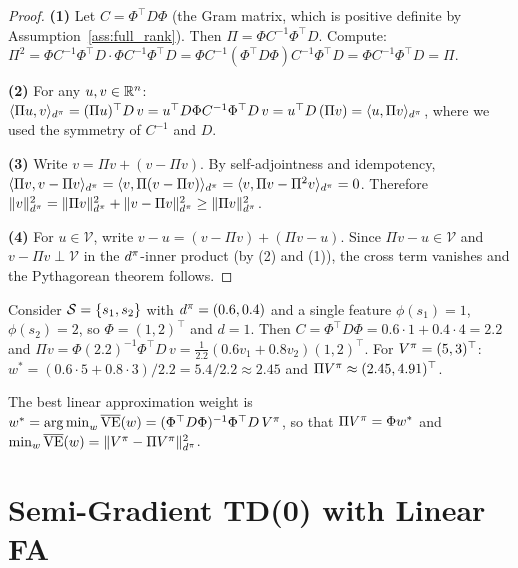 \documentclass[11pt,a4paper]{article}
\begin{document}
\begin{proof}
\textbf{(1)} Let $C = \Phi^\top D \Phi$ (the Gram matrix, which is
positive definite by Assumption~\ref{ass:full_rank}). Then
$\Pi = \Phi C^{-1} \Phi^\top D$. Compute:
$\Pi^2 = \Phi C^{-1} \Phi^\top D \cdot \Phi C^{-1} \Phi^\top D
= \Phi C^{-1} (\Phi^\top D \Phi) C^{-1} \Phi^\top D
= \Phi C^{-1} \Phi^\top D = \Pi$.

\textbf{(2)} For any $u, v \in \mathbb{R}^n$:
$\langle \Pi u, v \rangle_{d^\pi}
= (\Pi u)^\top D\, v
= u^\top D \Phi C^{-1} \Phi^\top D\, v
= u^\top D\, (\Pi v)
= \langle u, \Pi v \rangle_{d^\pi}$,
where we used the symmetry of $C^{-1}$ and $D$.

\textbf{(3)} Write $v = \Pi v + (v - \Pi v)$. By self-adjointness and
idempotency, $\langle \Pi v, v - \Pi v \rangle_{d^\pi}
= \langle v, \Pi(v - \Pi v) \rangle_{d^\pi}
= \langle v, \Pi v - \Pi^2 v \rangle_{d^\pi} = 0$.
Therefore $\|v\|_{d^\pi}^2 = \|\Pi v\|_{d^\pi}^2
+ \|v - \Pi v\|_{d^\pi}^2 \geq \|\Pi v\|_{d^\pi}^2$.

\textbf{(4)} For $u \in \mathcal{V}$, write
$v - u = (v - \Pi v) + (\Pi v - u)$. Since $\Pi v - u \in \mathcal{V}$
and $v - \Pi v \perp \mathcal{V}$ in the $d^\pi$-inner product
(by (2) and (1)), the cross term vanishes and the Pythagorean theorem
follows.
\end{proof}

\begin{example}
\label{ex:projection}
Consider $\mathcal{S} = \{s_1, s_2\}$ with $d^\pi = (0.6, 0.4)$ and
a single feature $\phi(s_1) = 1$, $\phi(s_2) = 2$, so
$\Phi = (1, 2)^\top$ and $d = 1$. Then
$C = \Phi^\top D \Phi = 0.6 \cdot 1 + 0.4 \cdot 4 = 2.2$ and
$\Pi v = \Phi (2.2)^{-1} \Phi^\top D\, v
= \frac{1}{2.2}(0.6 v_1 + 0.8 v_2)(1, 2)^\top$.
For $V^\pi = (5, 3)^\top$:
$w^* = (0.6 \cdot 5 + 0.8 \cdot 3)/2.2 = 5.4/2.2 \approx 2.45$
and $\Pi V^\pi \approx (2.45, 4.91)^\top$.
\end{example}

The best linear approximation weight is
$w^* = \operatorname{arg\,min}_w \overline{\mathrm{VE}}(w)
= (\Phi^\top D \Phi)^{-1} \Phi^\top D\, V^\pi$, so that
$\Pi V^\pi = \Phi w^*$ and
$\min_w \overline{\mathrm{VE}}(w)
= \|V^\pi - \Pi V^\pi\|_{d^\pi}^2$.

\section{Semi-Gradient TD(0) with Linear FA}
\label{sec:semi_gradient}
\end{document}
